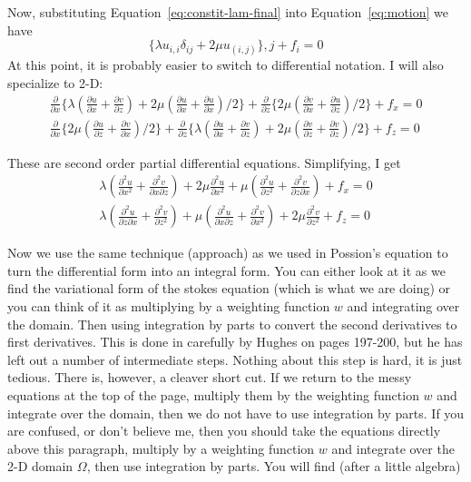 \documentclass{article}
\begin{document}
Now, substituting Equation~\ref{eq:constit-lam-final} into
Equation~\ref{eq:motion} we have
\begin{equation}
\{ \lambda u_{i,i} \delta_{ij} + 2 \mu u_{(i,j)} \},j + f_i = 0
\end{equation}
At this point, it is probably easier to switch to differential notation.  I
will also specialize to 2-D:
\begin{eqnarray}
\frac{\partial}{\partial x} \{ 
\lambda ( \frac{\partial u}{\partial x} + \frac{\partial v}{\partial z}) 
+ 2 \mu (\frac{\partial u}{\partial x} + \frac{\partial u}{\partial x} )/2 \}+
\frac{\partial}{\partial z} \{
2 \mu (\frac{\partial v}{\partial x} + \frac{\partial u}{\partial z} )/2 \}+
f_x = 0 \\
\frac{\partial}{\partial x} \{ 
2 \mu (\frac{\partial u}{\partial z} + \frac{\partial v}{\partial x} )/2  \}+
\frac{\partial}{\partial z} \{
\lambda ( \frac{\partial u}{\partial x} + \frac{\partial v}{\partial z} )
+ 2 \mu (\frac{\partial v}{\partial z} + \frac{\partial v}{\partial z} )/2 \}+
f_z = 0
\end{eqnarray}

These are second order partial differential equations.   Simplifying, I get
\begin{eqnarray}
\lambda (
\frac{\partial^2 u}{\partial x^2} + \frac{\partial^2 v}{\partial x\partial z} ) 
+ 2 \mu \frac{\partial^2 u}{\partial x^2} 
+ \mu ( \frac{\partial^2 u}{\partial z^2} 
+ \frac{\partial^2 v}{\partial z\partial x} ) 
+ f_x = 0 \\
\lambda ( 
\frac{\partial^2 u}{\partial z\partial x} + \frac{\partial^2 v}{\partial z^2} )
+ \mu ( \frac{\partial^2 u}{\partial x\partial z}
+ \frac{\partial^2 v}{\partial x^2} )
+ 2 \mu \frac{\partial^2 v}{\partial z^2} 
+ f_z = 0
\end{eqnarray}

Now we use the same technique (approach) as we used in Possion's equation to
turn the differential form into an integral form.   You can either look at it
as we find the variational form of the stokes equation (which is what we are
doing) or you can think of it as multiplying by a weighting function $w$ and
integrating over the domain.  Then using integration by parts to convert the
second derivatives to first derivatives.   This is done in carefully by
Hughes on pages 197-200, but he has left out a number of intermediate steps. 
Nothing about this step is hard, it is just tedious.  There is, however, a
cleaver short cut.   If we return to the messy equations at the top of the
page, multiply them by the weighting function $w$ and integrate over the
domain, then we do not have to use integration by parts.   If you are confused,
or don't believe me, then you should take the equations directly above this
paragraph, multiply by a weighting function $w$ and integrate over the 2-D
domain $\Omega$, then use integration by parts.   You will find (after a little
algebra)
\end{document}
